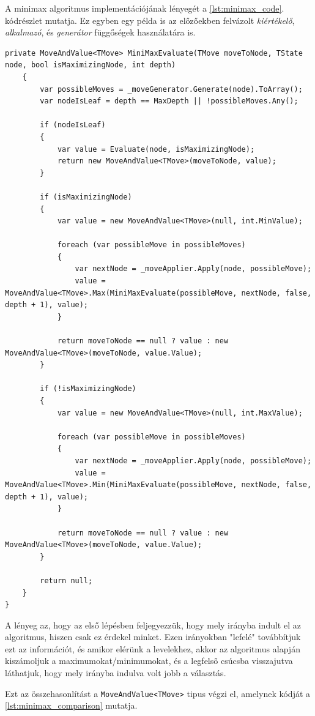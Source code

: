 \documentclass[twoside, a4paper, 12pt]{article}
\begin{document}
A minimax algoritmus implementációjának lényegét a \ref{lst:minimax_code}. kódrészlet mutatja. Ez egyben egy példa is az előzőekben felvázolt \textit{kiértékelő}, \textit{alkalmazó}, és \textit{generátor} függőségek használatára is.

\begin{lstlisting}[caption=Minimax (egszerűsített) kódja, label=lst:minimax_code, float]
	private MoveAndValue<TMove> MiniMaxEvaluate(TMove moveToNode, TState node, bool isMaximizingNode, int depth)
	{
		var possibleMoves = _moveGenerator.Generate(node).ToArray();
		var nodeIsLeaf = depth == MaxDepth || !possibleMoves.Any();

		if (nodeIsLeaf)
		{
			var value = Evaluate(node, isMaximizingNode);
			return new MoveAndValue<TMove>(moveToNode, value);
		}

		if (isMaximizingNode)
		{
			var value = new MoveAndValue<TMove>(null, int.MinValue);
		
			foreach (var possibleMove in possibleMoves)
			{
				var nextNode = _moveApplier.Apply(node, possibleMove);
				value = MoveAndValue<TMove>.Max(MiniMaxEvaluate(possibleMove, nextNode, false, depth + 1), value);
			}
		
			return moveToNode == null ? value : new MoveAndValue<TMove>(moveToNode, value.Value);
		}

		if (!isMaximizingNode)
		{
			var value = new MoveAndValue<TMove>(null, int.MaxValue);
		
			foreach (var possibleMove in possibleMoves)
			{
				var nextNode = _moveApplier.Apply(node, possibleMove);
				value = MoveAndValue<TMove>.Min(MiniMaxEvaluate(possibleMove, nextNode, false, depth + 1), value);
			}
		
			return moveToNode == null ? value : new MoveAndValue<TMove>(moveToNode, value.Value);
		}

		return null;
	}
}
\end{lstlisting}

A lényeg az, hogy az első lépésben feljegyezzük, hogy mely irányba indult el az algoritmus, hiszen csak ez érdekel minket. Ezen irányokban "lefelé" továbbítjuk ezt az információt, és amikor elérünk a levelekhez, akkor az algoritmus alapján kiszámoljuk a maximumokat/minimumokat, és a legfelső csúcsba visszajutva láthatjuk, hogy mely irányba indulva volt jobb a választás.

Ezt az összehasonlítást a \texttt{MoveAndValue<TMove>} tipus végzi el, amelynek kódját a \ref{lst:minimax_comparison} mutatja. 
\end{document}

